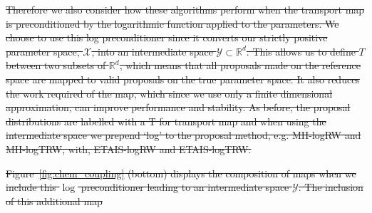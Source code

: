 \documentclass[final]{siamltex}
\providecommand{\DIFdel}[1]{{\protect\color{red}\sout{#1}}}                      %
\providecommand{\DIFaddbegin}{} %
\providecommand{\DIFdelbegin}{} %
\providecommand{\DIFdelend}{} %
\newcommand{\DIFscaledelfig}{0.5}
\newlength{\DIFdelgraphicswidth} %
\newlength{\DIFdelgraphicsheight} %
\newcommand{\DIFaddincludegraphics}[2][]{{\color{blue}\fbox{\DIFOincludegraphics[#1]{#2}}}} %
\newcommand{\DIFdelincludegraphics}[2][]{%
\sbox{\DIFdelgraphicsbox}{\DIFOincludegraphics[#1]{#2}}%
\settoboxwidth{\DIFdelgraphicswidth}{\DIFdelgraphicsbox} %
\settoboxtotalheight{\DIFdelgraphicsheight}{\DIFdelgraphicsbox} %
\scalebox{\DIFscaledelfig}{%
\parbox[b]{\DIFdelgraphicswidth}{\usebox{\DIFdelgraphicsbox}\\[-\baselineskip] \rule{\DIFdelgraphicswidth}{0em}}\llap{\resizebox{\DIFdelgraphicswidth}{\DIFdelgraphicsheight}{%
\setlength{\unitlength}{\DIFdelgraphicswidth}%
\begin{picture}(1,1)%
\thicklines\linethickness{2pt} %
{\color[rgb]{1,0,0}\put(0,0){\framebox(1,1){}}}%
{\color[rgb]{1,0,0}\put(0,0){\line( 1,1){1}}}%
{\color[rgb]{1,0,0}\put(0,1){\line(1,-1){1}}}%
\end{picture}%
}\hspace*{3pt}}} %
} %
\DeclareRobustCommand{\DIFaddbegin}{\DIFOaddbegin \let\includegraphics\DIFaddincludegraphics} %
\DeclareRobustCommand{\DIFdelbegin}{\DIFOdelbegin \let\includegraphics\DIFdelincludegraphics} %
\DeclareRobustCommand{\DIFdelend}{\DIFOaddend \let\includegraphics\DIFOincludegraphics} %
\begin{document}
\DIFdelbegin \DIFdel{Therefore we also consider how these algorithms perform when the transport map
is preconditioned by the logarithmic function applied to the parameters. We choose to use this log
preconditioner since it converts our strictly positive parameter
space, $\mathcal{X}$, into an intermediate space $\mathcal{Y} \subset
\mathbb{R}^d$. This allows us to define $T$ between two subsets of
$\mathbb{R}^d$, which means that all proposals made on the reference
space are mapped to valid
proposals on the true parameter space. It also reduces the work required of the map, which since
we use only a finite dimensional approximation, can improve
performance and stability. As before, the proposal distributions are labelled with a T for transport map and when using the intermediate space we prepend `log' to the proposal method, e.g. MH-logRW and MH-logTRW, with, ETAIS-logRW and ETAIS-logTRW.
}\DIFdelend %

\DIFdelbegin \DIFdel{Figure~\ref{fig:chem_coupling} (bottom) displays the composition of maps
when we include this $\log$ preconditioner leading to an intermediate space $\mathcal{Y}$. The inclusion of this additional map }\DIFdelend %
\DIFaddbegin 
\end{document}
